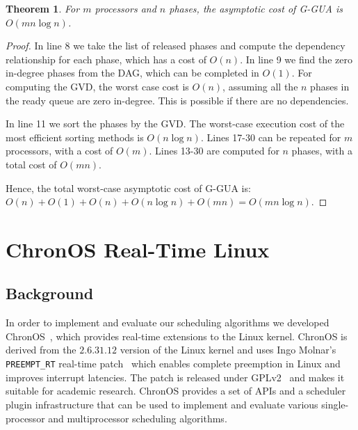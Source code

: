 \documentclass[12pt,dvips]{report}
\newtheorem{thm}{Theorem}
\begin{document}
\begin{thm} For $m$ processors and $n$ phases, the asymptotic cost of G-GUA is $O(mn \log n)$.
\end{thm}

\begin{proof} In line 8 we take the list of released phases and compute the dependency relationship for each phase, which has a cost of $O(n)$. In line 9 we find the zero in-degree phases from the DAG, which can be completed in $O(1)$. For computing the GVD, the worst case cost is $O(n)$, assuming all the $n$ phases in the ready queue are zero in-degree. This is possible if there are no dependencies. 

In line 11 we sort the phases by the GVD. The worst-case execution cost of the most efficient sorting methods is $O(n \log n)$. Lines 17-30 can be repeated for $m$ processors, with a cost of $O(m)$. Lines 13-30 are computed for $n$ phases, with a total cost of $O(mn)$.

Hence, the total worst-case asymptotic cost of G-GUA is: $O(n) + O(1) + O(n) + O(n \log n) + O(mn) = O(mn \log n)$.
\end{proof}

\chapter{ChronOS Real-Time Linux}\label{chap:chronos}

\section{Background}\label{sec:chronos-background}

In order to implement and evaluate our scheduling algorithms we developed ChronOS~\cite{chronos_url}, which provides real-time extensions to the Linux kernel. ChronOS is derived from the $2.6.31.12$ version of the Linux kernel and uses Ingo Molnar's \texttt{PREEMPT\_RT} real-time patch~\cite{preempt_rt} which enables complete preemption in Linux and improves interrupt latencies. The patch is released under GPLv2~\cite{gpl} and makes it suitable for academic research. ChronOS provides a set of APIs and a scheduler plugin infrastructure that can be used to implement and evaluate various single-processor and multiprocessor scheduling algorithms. 
\end{document}
